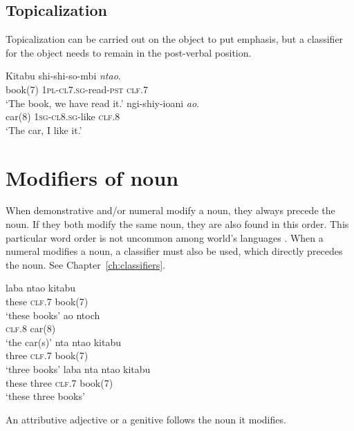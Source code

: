 \subsection{Topicalization}
Topicalization can be carried out on the object to put emphasis, but a classifier for the object needs to remain in the post-verbal position.

\begin{exe}
\ex
\gll Kitabu shi-shi-so-mbi \textit{nta\textbeltl o}. \\
book(7) \textsc{1pl}-\textsc{cl7.sg}-read-\textsc{pst} \textsc{clf}.7 \\
\trans `The book, we have read it.'
\ex
{} ngi-shiy-ioani \textit{a\textlyoghlig o}. \\
car(8) \textsc{1sg}-\textsc{cl8.sg}-like \textsc{clf}.8 \\
\trans `The car, I like it.'
\end{exe}

\section{Modifiers of noun}

When demonstrative and/or numeral modify a noun, they always precede the noun. If they both modify the same noun, they are also found in this order. This particular word order is not uncommon among world's languages \cite{Greenberg-1963}. When a numeral modifies a noun, a classifier must also be used, which directly precedes the noun. See Chapter~\ref{ch:classifiers}.

\begin{exe}
\ex
\gll laba nta\textbeltl o kitabu \\
these \textsc{clf.7} book(7) \\
\trans `these books'
\ex
\gll a\textlyoghlig o {ntoch\textramshorns} \\
\textsc{clf.8} car(8) \\
\trans `the car(s)'
\ex
\gll nta nta\textbeltl o kitabu \\
three \textsc{clf.7} book(7) \\
\trans `three books'
\ex
\gll laba nta nta\textbeltl o kitabu \\
these three \textsc{clf.7} book(7) \\
\trans `these three books'
\end{exe}

An attributive adjective or a genitive follows the noun it modifies.

